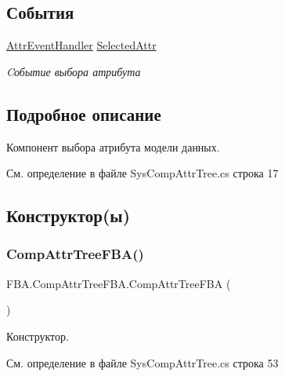\subsection*{События}
\begin{DoxyCompactItemize}
\item 
\mbox{\hyperlink{namespace_f_b_a_a0df7965ddd0519f1d83cbf05f2886d95}{Attr\+Event\+Handler}} \mbox{\hyperlink{class_f_b_a_1_1_comp_attr_tree_f_b_a_a01dfd1e2b5fc3689fef9203fc513c2c0}{Selected\+Attr}}
\begin{DoxyCompactList}\small\item\em Cобытие выбора атрибута \end{DoxyCompactList}\end{DoxyCompactItemize}


\subsection{Подробное описание}
Компонент выбора атрибута модели данных. ~\newline




См. определение в файле Sys\+Comp\+Attr\+Tree.\+cs строка 17



\subsection{Конструктор(ы)}
\mbox{\label{class_f_b_a_1_1_comp_attr_tree_f_b_a_ac50d58dd2a9a825bdb7a71cd089b331d}} 
\subsubsection{\texorpdfstring{Comp\+Attr\+Tree\+F\+B\+A()}{CompAttrTreeFBA()}}
{\footnotesize\ttfamily F\+B\+A.\+Comp\+Attr\+Tree\+F\+B\+A.\+Comp\+Attr\+Tree\+F\+BA (\begin{DoxyParamCaption}{ }\end{DoxyParamCaption})}



Конструктор. 



См. определение в файле Sys\+Comp\+Attr\+Tree.\+cs строка 53



